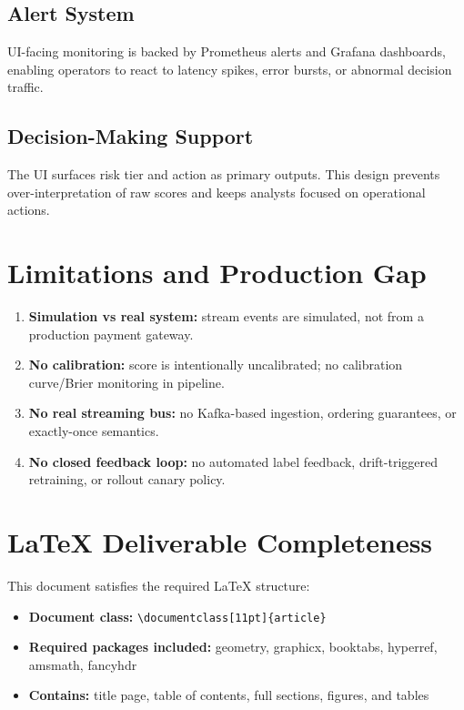 \documentclass[11pt]{article}
\begin{document}
\subsection{Alert System}
UI-facing monitoring is backed by Prometheus alerts and Grafana dashboards, enabling operators to react to latency spikes, error bursts, or abnormal decision traffic.

\subsection{Decision-Making Support}
The UI surfaces risk tier and action as primary outputs. This design prevents over-interpretation of raw scores and keeps analysts focused on operational actions.

\section{Limitations and Production Gap}
\begin{enumerate}
\item \textbf{Simulation vs real system:} stream events are simulated, not from a production payment gateway.
\item \textbf{No calibration:} score is intentionally uncalibrated; no calibration curve/Brier monitoring in pipeline.
\item \textbf{No real streaming bus:} no Kafka-based ingestion, ordering guarantees, or exactly-once semantics.
\item \textbf{No closed feedback loop:} no automated label feedback, drift-triggered retraining, or rollout canary policy.
\end{enumerate}

\section{LaTeX Deliverable Completeness}
This document satisfies the required LaTeX structure:
\begin{itemize}
\item \textbf{Document class:} \texttt{\textbackslash documentclass[11pt]\{article\}}
\item \textbf{Required packages included:} geometry, graphicx, booktabs, hyperref, amsmath, fancyhdr
\item \textbf{Contains:} title page, table of contents, full sections, figures, and tables
\end{itemize}
\end{document}
